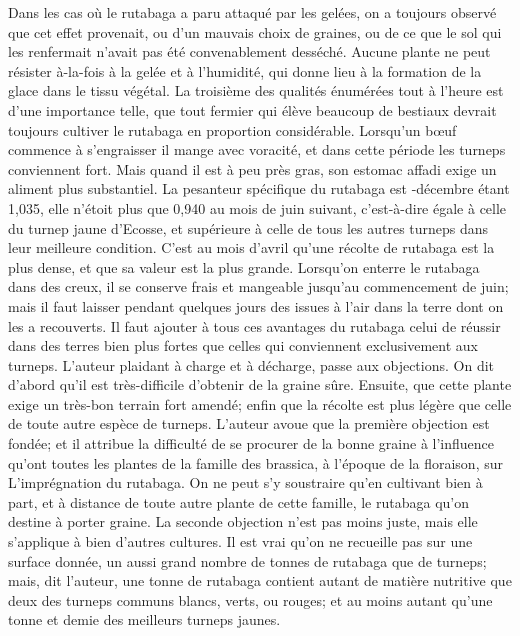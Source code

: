 Dans les cas où le rutabaga a paru attaqué par les gelées, on a toujours observé que cet effet provenait, ou d'un mauvais choix de graines, ou de ce que le sol qui les renfermait n'avait pas été convenablement desséché. Aucune plante ne peut résister à-la-fois à la gelée et à l'humidité, qui donne lieu à la formation de la glace dans le tissu végétal.
La troisième des qualités énumérées tout à l'heure est d'une importance telle, que tout fermier qui élève beaucoup de bestiaux devrait toujours cultiver le rutabaga en proportion considérable.
Lorsqu'un bœuf commence à s'engraisser il mange avec voracité, et dans cette période les turneps conviennent fort. Mais quand il est à peu près gras, son estomac affadi exige un aliment plus substantiel.
La pesanteur spécifique du rutabaga est\setcounter{page}{376} -décembre étant 1,035, elle n'étoit plus que 0,940 au mois de juin suivant, c'est-à-dire égale à celle du turnep jaune d'Ecosse, et supérieure à celle de tous les autres turneps dans leur meilleure condition. C'est au mois d'avril qu'une récolte de rutabaga est la plus dense, et que sa valeur est la plus grande.
Lorsqu'on enterre le rutabaga dans des creux, il se conserve frais et mangeable jusqu'au commencement de juin; mais il faut laisser pendant quelques jours des issues à l'air dans la terre dont on les a recouverts.
Il faut ajouter à tous ces avantages du rutabaga celui de réussir dans des terres bien plus fortes que celles qui conviennent exclusivement aux turneps.
L'auteur plaidant à charge et à décharge, passe aux objections.
On dit d'abord qu'il est très-difficile d'obtenir de la graine sûre. Ensuite, que cette plante exige un très-bon terrain fort amendé; enfin que la récolte est plus légère que celle de toute autre espèce de turneps.
L'auteur avoue que la première objection est fondée; et il attribue la difficulté de se procurer de la bonne graine à l'influence qu'ont toutes les plantes de la famille des brassica, à l'époque de la floraison, sur\setcounter{page}{377} L'imprégnation du rutabaga. On ne peut s'y soustraire qu'en cultivant bien à part, et à distance de toute autre plante de cette famille, le rutabaga qu'on destine à porter graine.
La seconde objection n'est pas moins juste, mais elle s'applique à bien d'autres cultures.
Il est vrai qu'on ne recueille pas sur une surface donnée, un aussi grand nombre de tonnes de rutabaga que de turneps; mais, dit l'auteur, une tonne de rutabaga contient autant de matière nutritive que deux des turneps communs blancs, verts, ou rouges; et au moins autant qu'une tonne et demie des meilleurs turneps jaunes.
